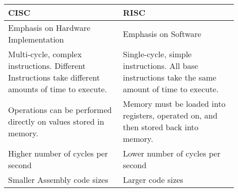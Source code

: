 \begin{table}[H]
\begin{centering}
\begin{tabular}{|m{0.45\linewidth}|m{0.45\linewidth}|}
\hline
\textbf{CISC} & \textbf{RISC} \\
\hline
Emphasis on Hardware Implementation 
    & Emphasis on Software \\
\hline
Multi-cycle, complex instructions. Different Instructions take different amounts of time to execute.
    & Single-cycle, simple instructions. All base instructions take the same amount of time to execute. \\
\hline
Operations can be performed directly on values stored in memory. 
    & Memory must be loaded into registers, operated on, and then stored back into memory. \\
\hline
Higher number of cycles per second 
    & Lower number of cycles per second \\
\hline
Smaller Assembly code sizes
    & Larger code sizes \\
\hline
\end{tabular}
\end{centering}
\end{table}